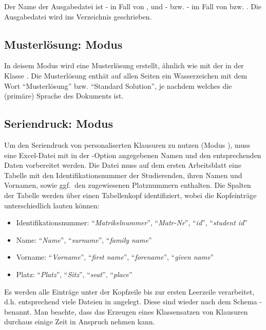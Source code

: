 \documentclass[
load=osgexam,
babel=ngerman
]{skdoc}
\begin{document}
Der Name der Ausgabedatei ist - in Fall von , und
- bzw. - im Fall von  bzw. . Die
Ausgabedatei wird ins Verzeichnis  geschrieben.

\subsection{Musterlösung: Modus }
In deisem Modus wird eine Musterlösung erstellt, ähnlich wie mit der  in der Klasse .
Die Musterlösung enthät auf allen Seiten ein Wasserzeichen mit dem Wort ``Musterlösung'' bzw. ``Standard Solution'', je
nachdem welches die (primäre) Sprache des Dokuments ist.

\subsection{Seriendruck: Modus }
\label{sec:series} 
Um den Seriendruck von personaliserten Klausuren zu nutzen (Modus ), muss eine Excel-Datei mit in der
-Option angegebenen Namen und den entsprechenden Daten vorbereitet werden.
 Die Datei muss auf dem ersten Arbeitsblatt eine Tabelle mit den Identifikationsnummer der
Studierenden, ihren Namen und Vornamen, sowie ggf.\ den zugewiesenen Platznummern enthalten. Die Spalten der Tabelle
werden über einen Tabellenkopf identifiziert, wobei die Kopfeinträge unterschiedlich lauten können:
\begin{itemize}[nosep]
  \item Identifikationsnummer: ``\emph{Matrikelnummer}'', ``\emph{Matr-Nr}'', ``\emph{id}'', ``\emph{student id}''
  \item Name: ``\emph{Name}'', ``\emph{surname}'', ``\emph{family name}''
  \item Vorname: ``\emph{Vorname}'', ``\emph{first name}'', ``\emph{forename}'', ``\emph{given name}''
  \item Platz: ``\emph{Platz}'', ``\emph{Sitz}'', ``\emph{seat}'', ``\emph{place}''
\end{itemize}
Es werden alle Einträge unter der Kopfzeile bis zur ersten Leerzeile verarbeitet, d.\;h. entsprechend viele Dateien in
 angelegt. Diese sind wieder nach dem Schema - benannt.
Man beachte, dass das Erzeugen eines Klassensatzen von Klausuren durchaus einige Zeit in Anspruch nehmen kann.
\end{document}
